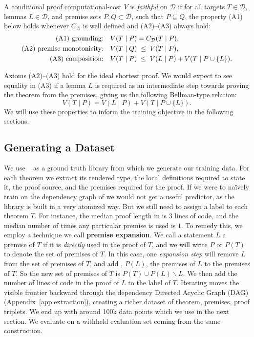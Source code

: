 \begin{definition}
\label{def:axioms}
A conditional proof computational-cost $V$ is \emph{faithful} on $\mathcal D$ if for all
targets $T \in \mathcal D$, lemmas $L \in \mathcal D$, and premise sets $P,Q \subset \mathcal D$, such that $P \subseteq Q$, the property (A1) below holds whenever $C_\mathcal D$ is well defined and (A2)--(A3) always hold:
\begin{align}
  \text{\textup{(A1) grounding:}}\quad
    &V(T\mid P)=  C_\mathcal D(T\mid P), \label{eq:grounding}\\
  \text{\textup{(A2) premise monotonicity:}}\quad
    &V(T\mid Q)\;\leq\;V(T\mid P), \label{eq:monotonicity}\\
  \text{\textup{(A3) composition:}}\quad
    &V(T\mid P)\;\leq\;V(L\mid P)+V(T\mid P\cup\{L\}).
    \label{eq:composition}
\end{align}
\end{definition}
%
Axioms (A2)--(A3) hold for the ideal shortest proof.
%
We would expect to see equality in (A3) if a lemma $L$ is required as an intermediate step towards proving the theorem from the premises, giving us the following Bellman-type relation:
%
\begin{equation}
  V(T\mid P) = V(L\mid P)+V(T\mid P\cup\{L\}).
  \label{eq:bellman}
\end{equation}
We will use these properties to inform the training objective in the following sections.

\subsection{Generating a Dataset}
\label{sec:data}
We use \Mathlib~\citep{moura2021lean4,mathlib2020} as a ground truth library from which we generate our training data.
%
For each theorem we extract its rendered type, the local definitions required to state it, the proof source, and the premises required for the proof.
%
If we were to naïvely train on the dependency graph of \Mathlib we would not get a useful predictor, as the library is built in a very atomized way.
%
But we still need to assign a label to each theorem $T$.
%
For instance, the median proof length in \Mathlib is $3$ lines of code, and the median number of times any particular premise is used is $1$.
%
To remedy this, we employ a technique we call \textbf{premise expansion}. 
%
We call a statement $L$ a premise of $T$ if it is \emph{directly} used in the proof of $T$, and we will write $P$ or $P(T)$ to denote the set of premises of $T$.
%
In this case, one \emph{expansion step} will remove $L$ from the set of premises of $T$, and add , $P(L)$, the premises of $L$ to the premises of $T$. So the new set of premises of $T$ is $P(T) \cup P(L) \backslash L$. We then add the number of lines of code in the proof of $L$ to the label of $T$.
%
Iterating moves the visible frontier backward through the dependency Directed Acyclic Graph (DAG)(Appendix~\ref{app:extraction}), creating a richer dataset of theorem, premises, proof triplets. We end up with around 100k data points which we use in the next section.
%
We evaluate on a withheld evaluation set coming from the same construction. 

